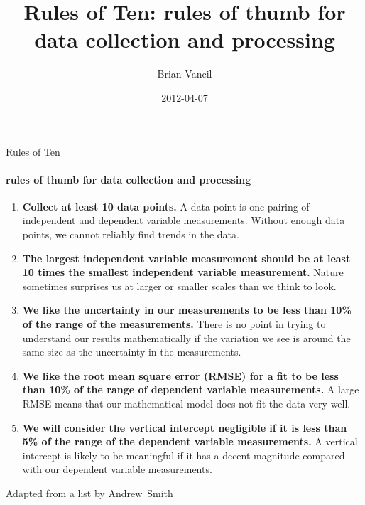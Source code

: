 \documentclass[final]{beamer} %
\title[Rules of Ten]{Rules of Ten: rules of thumb for data collection and processing}
\author[Vancil]{Brian Vancil}
\institute[Sumner]{Sumner Academy of Arts & Science}
\date{2012-04-07}
\newcommand{\header}[1]{\textcolor{royalblueweb}{\textbf{#1}}}
\newcommand{\spacing}{\vspace{1.0em}}
\newcommand{\parasep}{\vspace{-0.0\baselineskip}\textcolor{silver}{\large\hfill\FiveStar\hfill\FiveStar\hfill\FiveStar\hfill}\vspace{-0.0\baselineskip}}
\begin{document}
  \begin{frame}{Rules of Ten} 
  \framesubtitle{rules of thumb for data collection and processing}
  \vspace{-1.5em}\parasep
	\begin{enumerate}
	
\item \header{Collect at least 10 data points.}  A data point is one pairing of independent and dependent variable measurements.  Without enough data points, we cannot reliably find trends in the data. \spacing

\item \header{The largest independent variable measurement should be at least 10 times the smallest independent variable measurement.}  Nature sometimes surprises us at larger or smaller scales than we think to look. \spacing

\item \header{We like the uncertainty in our measurements to be less than 10\% of the range of the measurements.}  There is no point in trying to understand our results mathematically if the variation we see is around the same size as the uncertainty in the measurements. \spacing

\item \header{We like the root mean square error (RMSE) for a fit to be less than 10\% of the range of dependent variable measurements.}  A large RMSE means that our mathematical model does not fit the data very well. \spacing

\item \header{We will consider the vertical intercept negligible if it is less than 5\% of the range of the dependent variable measurements.}  A vertical intercept is likely to be meaningful if it has a decent magnitude compared with our dependent variable measurements.

	\end{enumerate}
        \spacing\parasep
	\begin{center}\footnotesize
	 Adapted from a list by Andrew~Smith
	\end{center}
  \end{frame}
  
\end{document}
